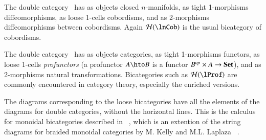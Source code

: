 \begin{eg}
  The double category \lnCob\ has as objects closed $n$-manifolds, as
  tight 1-morphisms diffeomorphisms, as loose 1-cells cobordisms, and as
  2-morphisms diffeomorphisms between cobordisms.  Again $\cH(\lnCob)$
  is the usual bicategory of cobordisms.
\end{eg}

\begin{eg}
  The double category \lProf\ has as objects categories, as
  tight 1-morphisms functors, as loose 1-cells \emph{profunctors} (a profunctor
  $A\hto B$ is a functor $B^{\mathit{op}}\times A\to \mathbf{Set}$), and as
  2-morphisms natural transformations.  Bicategories such as
  $\cH(\lProf)$ are commonly encountered in category theory,
  especially the enriched versions.
\end{eg}


The diagrams corresponding to the loose bicategories have all the elements of the diagrams for double categories, without the horizontal lines. This is the calculus for monoidal bicategories described in ~\cite{bms}, which is an extention of the string diagrams for braided monoidal categories by M. Kelly and M.L. Laplaza ~\cite{kellylaplaza}.


